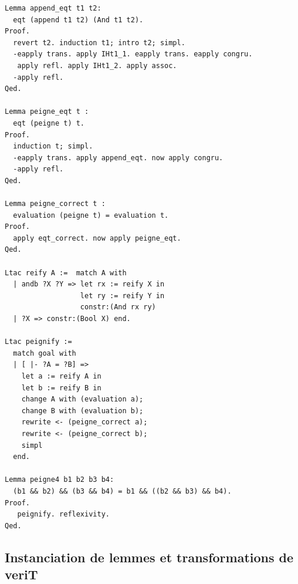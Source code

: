 \documentclass[11pt]{article}
\begin{document}
\begin{lstlisting}[frame=single]
Lemma append_eqt t1 t2:
  eqt (append t1 t2) (And t1 t2).
Proof.
  revert t2. induction t1; intro t2; simpl.
  -eapply trans. apply IHt1_1. eapply trans. eapply congru.
   apply refl. apply IHt1_2. apply assoc.
  -apply refl.
Qed.

Lemma peigne_eqt t :
  eqt (peigne t) t.
Proof.
  induction t; simpl.
  -eapply trans. apply append_eqt. now apply congru.
  -apply refl.
Qed.

Lemma peigne_correct t :
  evaluation (peigne t) = evaluation t.
Proof.
  apply eqt_correct. now apply peigne_eqt.
Qed. 

Ltac reify A :=  match A with
  | andb ?X ?Y => let rx := reify X in
                  let ry := reify Y in
                  constr:(And rx ry)
  | ?X => constr:(Bool X) end.

Ltac peignify :=
  match goal with
  | [ |- ?A = ?B] =>
    let a := reify A in
    let b := reify B in
    change A with (evaluation a);
    change B with (evaluation b);
    rewrite <- (peigne_correct a);
    rewrite <- (peigne_correct b);
    simpl
  end.

Lemma peigne4 b1 b2 b3 b4:
  (b1 && b2) && (b3 && b4) = b1 && ((b2 && b3) && b4).
Proof.
   peignify. reflexivity.
Qed.
\end{lstlisting}

\subsection{Instanciation de lemmes et transformations de veriT} \label{simplifications}
\end{document}
